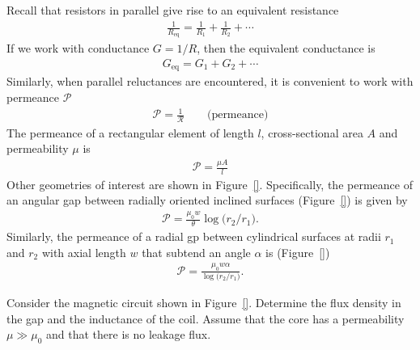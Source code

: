 \documentclass[12pt,a4paper,oneside]{book}
\begin{document}
\begin{onehalfspace}
Recall that resistors in parallel give rise to an equivalent resistance 
\begin{equation*}\label{}
	{\begin{aligned}
			\frac{1}{R_\text{eq}}=\frac{1}{R_1}+\frac{1}{R_2}+\cdots
	\end{aligned}}
\end{equation*} 
If we work with conductance $G=1/R$, then the equivalent conductance is
\begin{equation*}\label{}
	{\begin{aligned}
			G_\text{eq}=G_1+G_2+\cdots
	\end{aligned}}
\end{equation*} 
Similarly, when parallel reluctances  are encountered, it is convenient to work with permeance $\mathscr{P}$
\begin{equation*}\label{}
	{\begin{aligned}
		\mathscr{P}=\frac{1}{\mathscr{R}}\qquad\text{(permeance)}
	\end{aligned}}
\end{equation*} 
The permeance of a rectangular element of length $l$, cross-sectional area $A$ and permeability $\mu$ is
\begin{equation*}\label{}
	{\begin{aligned}
			\mathscr{P}=\frac{\mu A}{l}
	\end{aligned}}
\end{equation*} 
Other geometries of interest are shown in Figure~\ref{}. Specifically, the permeance of an angular gap between radially oriented inclined surfaces (Figure~\ref{}) is given by
\begin{equation*}\label{}
	{\begin{aligned}
			\mathscr{P}=\frac{\mu_0 w}{\theta}\log\Big(r_2/r_1\Big).
	\end{aligned}}
\end{equation*}  
Similarly, the permeance of a radial gp between cylindrical surfaces at radii $r_1$ and $r_2$ with axial length $w$ that subtend an angle $\alpha$ is (Figure~\ref{}) 
\begin{equation*}\label{}
	{\begin{aligned}
			\mathscr{P}=\frac{\mu_0 w \alpha}{\log\Big(r_2/r_1\Big)}.
	\end{aligned}}
\end{equation*}

\begin{example}
	Consider the magnetic circuit shown in Figure~\ref{}. Determine the flux density in the gap and the inductance of the coil. Assume that the core has a permeability  $\mu\gg\mu_0$ and that there is no leakage flux.
	

\end{example}
\end{onehalfspace}
\end{document}
